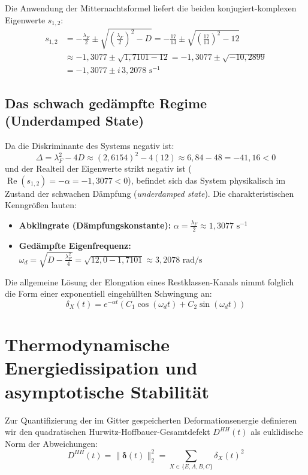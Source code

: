 \documentclass[11pt,a4paper]{article}
\begin{document}
	Die Anwendung der Mitternachtsformel liefert die beiden konjugiert-komplexen Eigenwerte $s_{1,2}$:
	\begin{align}
		s_{1,2} &= -\frac{\lambda_F}{2} \pm \sqrt{\left(\frac{\lambda_F}{2}\right)^2 - D} 
		= -\frac{17}{13} \pm \sqrt{\left(\frac{17}{13}\right)^2 - 12} \\
		&\approx -1{,}3077 \pm \sqrt{1{,}7101 - 12} 
		= -1{,}3077 \pm \sqrt{-10{,}2899} \\
		&= -1{,}3077 \pm i \, 3{,}2078 \text{ s}^{-1}
	\end{align}
	
	\subsection{Das schwach gedämpfte Regime (Underdamped State)}
	Da die Diskriminante des Systems negativ ist:
	\begin{equation}
		\Delta = \lambda_F^2 - 4D \approx (2{,}6154)^2 - 4(12) \approx 6{,}84 - 48 = -41{,}16 < 0
	\end{equation}
	und der Realteil der Eigenwerte strikt negativ ist ($\operatorname{Re}(s_{1,2}) = -\alpha = -1{,}3077 < 0$), befindet sich das System physikalisch im Zustand der schwachen Dämpfung (\emph{underdamped state}). Die charakteristischen Kenngrößen lauten:
	\begin{itemize}
		\item \textbf{Abklingrate (Dämpfungskonstante):} $\alpha = \frac{\lambda_F}{2} \approx 1{,}3077 \text{ s}^{-1}$
		\item \textbf{Gedämpfte Eigenfrequenz:} $\omega_d = \sqrt{D - \frac{\lambda_F^2}{4}} = \sqrt{12{,}0 - 1{,}7101} \approx 3{,}2078 \text{ rad/s}$
	\end{itemize}
	
	Die allgemeine Lösung der Elongation eines Restklassen-Kanals nimmt folglich die Form einer exponentiell eingehüllten Schwingung an:
	\begin{equation}
		\delta_X(t) = e^{-\alpha t} \left( C_1 \cos(\omega_d t) + C_2 \sin(\omega_d t) \right)
	\end{equation}
	
	\section{Thermodynamische Energiedissipation und asymptotische Stabilität}
	
	Zur Quantifizierung der im Gitter gespeicherten Deformationsenergie definieren wir den quadratischen Hurwitz-Hoffbauer-Gesamtdefekt $D^{HH}(t)$ als euklidische Norm der Abweichungen:
	\begin{equation}
		D^{HH}(t) = \|\boldsymbol{\delta}(t)\|_2^2 = \sum_{X \in \{E,A,B,C\}} \delta_X(t)^2
	\end{equation}
	
\end{document}
